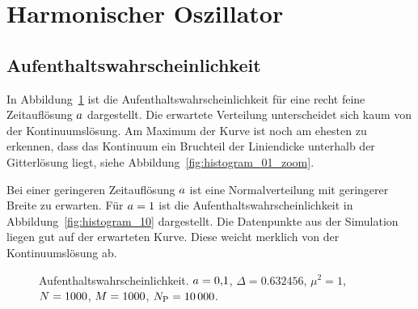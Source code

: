 \section{Harmonischer Oszillator}

\subsection{Aufenthaltswahrscheinlichkeit}


In Abbildung~\ref{fig:histogram_01} ist die Aufenthaltswahrscheinlichkeit für
eine recht feine Zeitauflösung $a$ dargestellt. Die erwartete
Verteilung unterscheidet sich kaum von der Kontinuumslösung. Am Maximum der
Kurve ist noch am ehesten zu erkennen, dass das Kontinuum ein Bruchteil der
Liniendicke unterhalb der Gitterlösung liegt, siehe
Abbildung~\ref{fig:histogram_01_zoom}.

Bei einer geringeren Zeitauflösung $a$ ist eine Normalverteilung mit
geringerer Breite zu erwarten. Für $a = \num{1}$ ist die
Aufenthaltswahrscheinlichkeit in Abbildung~\ref{fig:histogram_10} dargestellt.
Die Datenpunkte aus der Simulation liegen gut auf der erwarteten Kurve. Diese
weicht merklich von der Kontinuumslösung ab.

\begin{figure}[htbp]
    \centering
    \caption{%
        Aufenthaltswahrscheinlichkeit. $a =
        \num{0.1}$, $\Delta = \num{0.632456}$, $\mu^2 = \num{1}$, $N =
        \num{1000}$, $M = \num{1000}$, $N_\text P = \num{10000}$.
    }
    \label{fig:histogram_01}
\end{figure}

